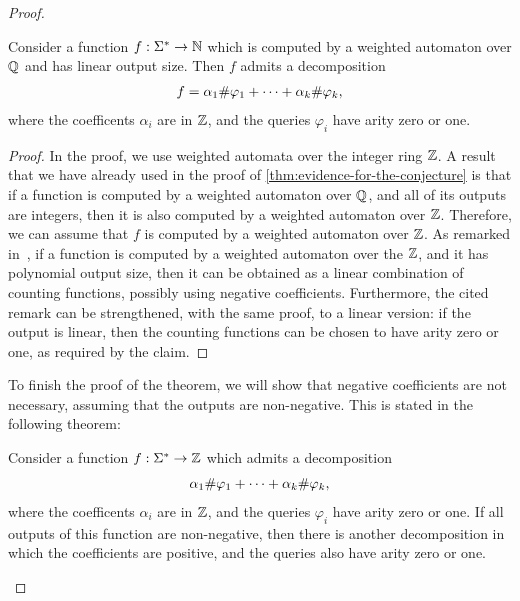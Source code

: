 \begin{proof}
\begin{claim}\label{claim:mso-counting-regular-with-negative}
    Consider a function $f : \Sigma^* \to {\mathbb N}$ which is computed by a weighted automaton over ${\mathbb Q}$ and has linear output size. Then $f$ admits a decomposition 
    \begin{align*}
    f = \alpha_1 \#{\varphi_1} + \cdots +  \alpha_k \#{\varphi_k},
    \end{align*}        
        where the coefficents $\alpha_i$ are in ${\mathbb Z}$, and the queries $\varphi_i$ have arity zero or one.
\end{claim}
\begin{proof}
    In the proof, we use weighted automata over the integer ring ${\mathbb Z}$. A result that we have already used in the proof of \cref{thm:evidence-for-the-conjecture} is that if a function is computed by a weighted automaton over ${\mathbb Q}$, and all of its outputs are integers,  then it is also computed by a weighted automaton over ${\mathbb Z}$. Therefore, we can assume that $f$ is computed by a weighted automaton over ${\mathbb Z}$.
    As remarked in~\cite[Remark II.21]{Zpolyreg23}, if a function is computed by a weighted automaton over the ${\mathbb Z}$, and it has polynomial output size, then it can be obtained as a linear combination of \mso counting functions, possibly using negative coefficients. Furthermore, the cited remark can be strengthened, with the same proof, to a linear version: if the output is linear, then the \mso counting functions can be chosen to have arity zero or one, as required by the claim.
\end{proof}

To finish the proof of the theorem, we will show that negative coefficients are not necessary, assuming that the outputs are non-negative. This is stated in the following theorem:
\begin{theorem}\label{thm:int-to-nat}
    Consider a function $f : \Sigma^* \to  {\mathbb Z}$ which admits a decomposition
    \begin{align*}
 \alpha_1 \#{\varphi_1} + \cdots +  \alpha_k \#{\varphi_k},
    \end{align*}        
        where the coefficents $\alpha_i$ are in ${\mathbb Z}$, and the queries $\varphi_i$ have arity zero or one. If all outputs of this function are non-negative, then there is another decomposition in which the coefficients are positive, and the queries also have arity zero or one.
\end{theorem}


\end{proof}
